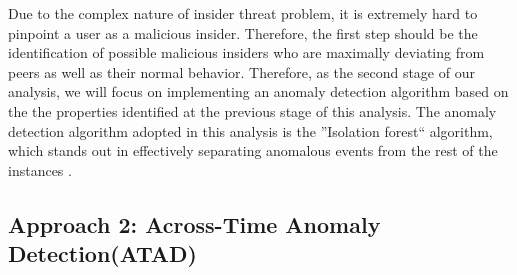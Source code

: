 \documentclass[conference]{IEEEtran}
\begin{document}
Due to the complex nature of insider threat problem, it is extremely hard to pinpoint a user as a malicious insider. Therefore, the first step should be the identification of possible malicious insiders who are maximally deviating from peers as well as their normal behavior. Therefore, as the second stage of our analysis, we will focus on implementing an anomaly detection algorithm based on the the  properties identified at the previous stage of this analysis. The anomaly detection algorithm adopted in this analysis is the ''Isolation forest`` algorithm, which stands out in effectively separating anomalous events from the rest of the instances \cite{b43}.

\subsection{Approach 2: Across-Time Anomaly Detection(ATAD)}
\end{document}
